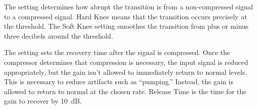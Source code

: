 {The  setting determines how abrupt the transition is from a
non-compressed signal to a compressed signal.  Hard Knee means that the
transition occurs precisely at the threshold.  The Soft Knee setting smoothes
the transition from plus or minus three decibels around the threshold.

The  setting sets the recovery time after the signal is
compressed.  Once the compressor determines that compression is necessary,
the input signal is reduced appropriately, but the gain isn't allowed to
immediately return to normal levels.  This is necessary to reduce artifacts
such as ``pumping.''  Instead, the gain is allowed to return to normal at the
chosen rate.  Release Time is the time for the gain to recover by 10~dB.
}
